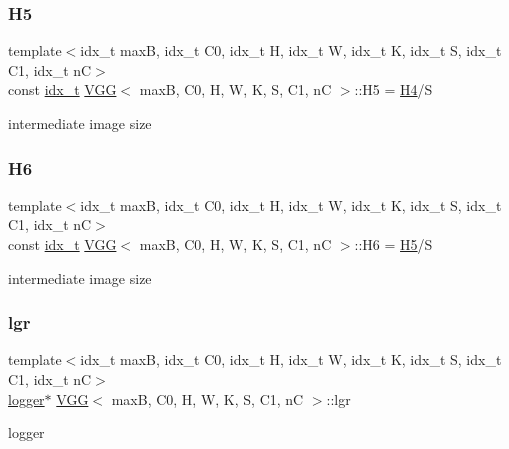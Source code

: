 \subsubsection{\texorpdfstring{H5}{H5}}
{\footnotesize\ttfamily template$<$idx\+\_\+t maxB, idx\+\_\+t C0, idx\+\_\+t H, idx\+\_\+t W, idx\+\_\+t K, idx\+\_\+t S, idx\+\_\+t C1, idx\+\_\+t nC$>$ \\
const \hyperlink{vgg__util_8h_a8e93478a00e685bea5e6a3f617bf03a3}{idx\+\_\+t} \hyperlink{structVGG}{V\+GG}$<$ maxB, C0, H, W, K, S, C1, nC $>$\+::H5 = \hyperlink{structVGG_a1754afced5b0bbb91031179c1f58ee29}{H4}/S\hspace{0.3cm}{\ttfamily [static]}}

intermediate image size \mbox{\label{structVGG_aca7e136480c1e76d74bda917c1ddca97}} 
\subsubsection{\texorpdfstring{H6}{H6}}
{\footnotesize\ttfamily template$<$idx\+\_\+t maxB, idx\+\_\+t C0, idx\+\_\+t H, idx\+\_\+t W, idx\+\_\+t K, idx\+\_\+t S, idx\+\_\+t C1, idx\+\_\+t nC$>$ \\
const \hyperlink{vgg__util_8h_a8e93478a00e685bea5e6a3f617bf03a3}{idx\+\_\+t} \hyperlink{structVGG}{V\+GG}$<$ maxB, C0, H, W, K, S, C1, nC $>$\+::H6 = \hyperlink{structVGG_a763d01cce59fd355cbcfb7b09c3c8cdc}{H5}/S\hspace{0.3cm}{\ttfamily [static]}}

intermediate image size \mbox{\label{structVGG_a5a8069856b54deb20f0b45e4522d9e4a}} 
\subsubsection{\texorpdfstring{lgr}{lgr}}
{\footnotesize\ttfamily template$<$idx\+\_\+t maxB, idx\+\_\+t C0, idx\+\_\+t H, idx\+\_\+t W, idx\+\_\+t K, idx\+\_\+t S, idx\+\_\+t C1, idx\+\_\+t nC$>$ \\
\hyperlink{structlogger}{logger}$\ast$ \hyperlink{structVGG}{V\+GG}$<$ maxB, C0, H, W, K, S, C1, nC $>$\+::lgr}

logger \mbox{\label{structVGG_a065b2bedbdef89ba2943d696fb54da61}} 
